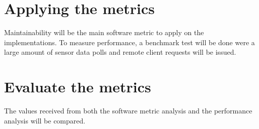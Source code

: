 \section{Applying the metrics}

Maintainability will be the main software metric to apply on the
implementations. To measure performance, a benchmark test will be done were a
large amount of sensor data polls and remote client requests will be issued.

\section{Evaluate the metrics}

The values received from both the software metric analysis and the performance
analysis will be compared.
